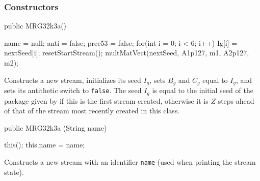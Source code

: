 \subsubsection* {Constructors}

\begin{code}

   public MRG32k3a() \begin{hide} {
      name = null;
      anti = false;
      prec53 = false;
      for(int i = 0; i < 6; i++)
         Ig[i] = nextSeed[i];
      resetStartStream();
      multMatVect(nextSeed, A1p127, m1, A2p127, m2);
   } \end{hide}
\end{code}
 \begin{tabb} Constructs a new stream, initializes its seed $I_g$,
   sets $B_g$ and $C_g$ equal to $I_g$, and sets its antithetic switch
   to \texttt{false}.
   The seed $I_g$ is equal to the initial seed of the package given by
    if this is the first stream created,
   otherwise it is $Z$ steps ahead of that of the stream most recently
   created in this class.
 \end{tabb}
\begin{code}

   public MRG32k3a (String name) \begin{hide} {
      this();
      this.name = name;
   } \end{hide}
\end{code}
 \begin{tabb}  Constructs a new stream with an identifier \texttt{name}
   (used when printing the stream state).
 \end{tabb}
\begin{htmlonly}
\end{htmlonly}

